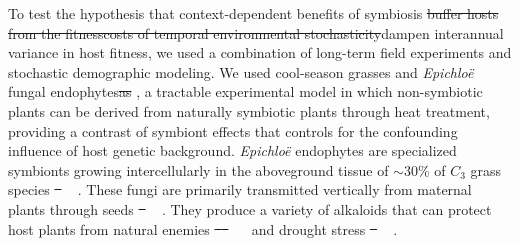 \documentclass[lineno, sn-basic]{sn-jnl}%
\providecommand{\DIFadd}[1]{{\protect\color{blue}#1}} %
\providecommand{\DIFdel}[1]{{\protect\color{red}\protect\scriptsize\sout{#1}}}
\providecommand{\DIFadd}[1]{{\protect\color{blue}\uwave{#1}}} %
\providecommand{\DIFdel}[1]{{\protect\color{red}\sout{#1}}}                      %
\providecommand{\DIFaddbegin}{} %
\providecommand{\DIFaddend}{} %
\providecommand{\DIFdelbegin}{} %
\providecommand{\DIFdelend}{} %
\newcommand{\DIFscaledelfig}{0.5}
\newlength{\DIFdelgraphicswidth} %
\newlength{\DIFdelgraphicsheight} %
\newcommand{\DIFaddincludegraphics}[2][]{{\color{blue}\fbox{\DIFOincludegraphics[#1]{#2}}}} %
\newcommand{\DIFdelincludegraphics}[2][]{%
\sbox{\DIFdelgraphicsbox}{\DIFOincludegraphics[#1]{#2}}%
\settoboxwidth{\DIFdelgraphicswidth}{\DIFdelgraphicsbox} %
\settoboxtotalheight{\DIFdelgraphicsheight}{\DIFdelgraphicsbox} %
\scalebox{\DIFscaledelfig}{%
\parbox[b]{\DIFdelgraphicswidth}{\usebox{\DIFdelgraphicsbox}\\[-\baselineskip] \rule{\DIFdelgraphicswidth}{0em}}\llap{\resizebox{\DIFdelgraphicswidth}{\DIFdelgraphicsheight}{%
\setlength{\unitlength}{\DIFdelgraphicswidth}%
\begin{picture}(1,1)%
\thicklines\linethickness{2pt} %
{\color[rgb]{1,0,0}\put(0,0){\framebox(1,1){}}}%
{\color[rgb]{1,0,0}\put(0,0){\line( 1,1){1}}}%
{\color[rgb]{1,0,0}\put(0,1){\line(1,-1){1}}}%
\end{picture}%
}\hspace*{3pt}}} %
} %
\DeclareRobustCommand{\DIFaddbegin}{\DIFOaddbegin \let\includegraphics\DIFaddincludegraphics} %
\DeclareRobustCommand{\DIFaddend}{\DIFOaddend \let\includegraphics\DIFOincludegraphics} %
\DeclareRobustCommand{\DIFdelbegin}{\DIFOdelbegin \let\includegraphics\DIFdelincludegraphics} %
\DeclareRobustCommand{\DIFdelend}{\DIFOaddend \let\includegraphics\DIFOincludegraphics} %
\begin{document}
To test the hypothesis that context-dependent benefits of symbiosis \DIFdelbegin \DIFdel{buffer hosts from the fitnesscosts of temporal environmental stochasticity}\DIFdelend \DIFaddbegin \DIFadd{dampen interannual variance in host fitness}\DIFaddend , we used a combination of long-term field experiments and stochastic demographic modeling.
We used cool-season grasses and \emph{Epichlo\"{e}} fungal endophytes\DIFdelbegin \DIFdel{as }\DIFdelend \DIFaddbegin \DIFadd{, }\DIFaddend a tractable experimental model in which non-symbiotic plants can be derived from naturally symbiotic plants through heat treatment, providing a contrast of symbiont effects that controls for the confounding influence of host genetic background. 
\emph{Epichlo\"{e}} endophytes are specialized symbionts growing intercellularly in the aboveground tissue of  $\sim30$\% of $C_{3}$ grass species \DIFdelbegin \DIFdel{\mbox{%
\cite{leuchtmann1992systematics}}\hspace{0pt}%
}\DIFdelend \DIFaddbegin \DIFadd{\mbox{%
\citep{leuchtmann1992systematics}}\hspace{0pt}%
}\DIFaddend .
These fungi are primarily transmitted vertically from maternal plants through seeds \DIFdelbegin \DIFdel{\mbox{%
\cite{cheplick2009ecology}}\hspace{0pt}%
}\DIFdelend \DIFaddbegin \DIFadd{\mbox{%
\citep{cheplick2009ecology}}\hspace{0pt}%
}\DIFaddend .
They produce a variety of alkaloids that can protect host plants from natural enemies \DIFdelbegin \DIFdel{\mbox{%
\cite{brem2001epichloe} }\hspace{0pt}%
}\DIFdelend \DIFaddbegin \DIFadd{\mbox{%
\citep{brem2001epichloe} }\hspace{0pt}%
}\DIFaddend and drought stress \DIFdelbegin \DIFdel{\mbox{%
\cite{decunta2021systematic}}\hspace{0pt}%
}\DIFdelend \DIFaddbegin \DIFadd{\mbox{%
\citep{decunta2021systematic}}\hspace{0pt}%
}\DIFaddend .
\end{document}
